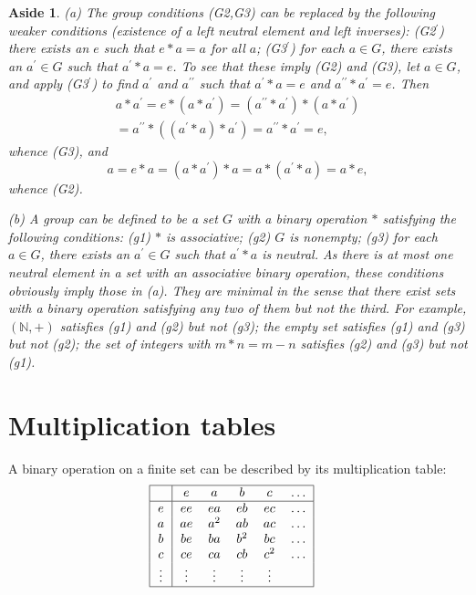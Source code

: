 \documentclass[a4paper,11pt,final,openany]{memoir}%
\newtheorem{aside}[X]{Aside}
\theoremstyle{nonumberplain}
\begin{document}
\begin{aside}
\label{bd3z}(a) The group conditions (G2,G3) can be replaced by the following
weaker conditions (existence of a left neutral element and left inverses):
(G2$^{\prime}$) there exists an $e$ such that $e\ast a=a$ for all $a$;
(G3$^{\prime}$) for each $a\in G$, there exists an $a^{\prime}\in G$ such that
$a^{\prime}\ast a=e$. To see that these imply (G2) and (G3), let $a\in G$, and
apply (G3$^{\prime}$) to find $a^{\prime}$ and $a^{\prime\prime}$ such that
$a^{\prime}\ast a=e$ and $a^{\prime\prime}\ast a^{\prime}=e$. Then%
\begin{align*}
a\ast a^{\prime}=e\ast(a\ast a^{\prime})=(a^{\prime\prime}\ast a^{\prime}%
)\ast(a\ast a^{\prime})\\
=a^{\prime\prime}\ast\left(  (a^{\prime}\ast a)\ast
a^{\prime}\right)  =a^{\prime\prime}\ast a^{\prime}=e,
\end{align*}
whence (G3), and%
\[
a=e\ast a=(a\ast a^{\prime})\ast a=a\ast(a^{\prime}\ast a)=a\ast e,
\]
whence (G2).

(b) A group can be defined to be a set $G$ with a binary operation $\ast$
satisfying the following conditions: (g1) $\ast$ is associative; (g2) $G$ is
nonempty; (g3) for each $a\in G$, there exists an $a^{\prime}\in G$ such that
$a^{\prime}\ast a$ is neutral. As there is at most one neutral element in a
set with an associative binary operation, these conditions obviously imply
those in (a). They are minimal in the sense that there exist sets with a
binary operation satisfying any two of them but not the third. For example,
$(\mathbb{N}{},+)$ satisfies (g1) and (g2) but not (g3); the empty set
satisfies (g1) and (g3) but not (g2); the set of integers with $m*n=m-n$
satisfies (g2) and (g3) but not (g1).
\end{aside}

\section{Multiplication tables}

A binary operation on a finite set can be described by its multiplication
table:%
\[%
\begin{tabular}
[c]{|c|ccccc|}\hline
& $e$ & $a$ & $b$ & $c$ & $\ldots$\\\hline
$e$ & $ee$ & $ea$ & $eb$ & $ec$ & $\ldots$\\
$a$ & $ae$ & $a^{2}$ & $ab$ & $ac$ & $\ldots$\\
$b$ & $be$ & $ba$ & $b^{2}$ & $bc$ & $\ldots$\\
$c$ & $ce$ & $ca$ & $cb$ & $c^{2}$ & $\ldots$\\
$\vdots$ & $\vdots$ & $\vdots$ & $\vdots$ & $\vdots$ & \\\hline
\end{tabular}
\ \ \
\]
\end{document}
